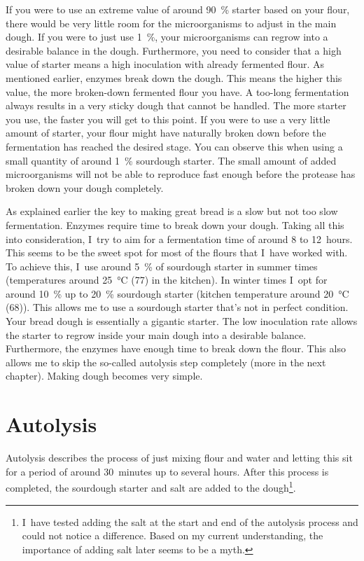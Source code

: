 If you were to use an extreme value of around \qty{90}{\percent} starter based on your flour, there
would be very little room for the microorganisms to adjust in the main dough.
If you were to just use \qty{1}{\percent}, your microorganisms can regrow into a
desirable balance in the dough. Furthermore, you need to consider that a high value
of starter means a high inoculation with already fermented flour. As
mentioned earlier, enzymes break down the dough. This means the higher this
value, the more broken-down fermented flour you have. A too-long fermentation
always results in a very sticky dough that cannot be handled. The more
starter you use, the faster you will get to this point. If you were to use a
very little amount of starter, your flour might have naturally broken down
before the fermentation has reached the desired stage. You can observe this
when using a small quantity of around \qty{1}{\percent} sourdough starter. The small
amount of added microorganisms will not be able to reproduce fast enough
before the protease has broken down your dough completely.

As explained earlier the key to making great bread is a slow but not too slow
fermentation. Enzymes require time to break down your dough. Taking all this
into consideration, I~try to aim for a fermentation time of around 8 to 12~hours. This seems to be
the sweet spot for most of the flours that I~have worked with. To achieve this,
I~use around \qty{5}{\percent} of sourdough starter in summer times
(temperatures around \qty{25}{\degreeCelsius} (\qty{77}{\degF}) in the
kitchen). In winter times I~opt for around \qty{10}{\percent} up to
\qty{20}{\percent} sourdough starter (kitchen temperature around
\qty{20}{\degreeCelsius} (\qty{68}{\degF})). This
allows me to use a sourdough starter that's not in perfect condition. Your
bread dough is essentially a gigantic starter. The low inoculation rate allows
the starter to regrow inside your main dough into a desirable balance.
Furthermore, the enzymes have enough time to break down the flour. This also
allows me to skip the so-called autolysis step completely (more in the next chapter).
Making dough becomes very simple.

\section{Autolysis}%
\label{section:autolysis}

Autolysis describes the process of just mixing flour and water and letting
this sit for a period of around 30~minutes up to several hours. After this
process is completed, the sourdough starter and salt are added to the
dough\footnote{I~have tested adding the salt at the start and end of the
autolysis process and could not notice a difference. Based on my current
understanding, the importance of adding salt later seems to be a myth.}.

